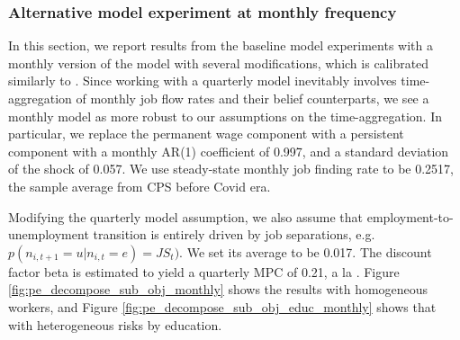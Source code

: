 \subsubsection{Alternative model experiment at monthly frequency}

In this section, we report results from the baseline model experiments with a monthly version of the model with several modifications, which is calibrated similarly to \cite{kekre2023unemployment}. Since working with a quarterly model inevitably involves time-aggregation of monthly job flow rates and their belief counterparts, we see a monthly model as more robust to our assumptions on the time-aggregation. In particular, we replace the permanent wage component with a persistent component with a monthly AR(1) coefficient of 0.997, and a standard deviation of the shock of 0.057. We use steady-state monthly job finding rate to be 0.2517, the sample average from CPS before Covid era. 

Modifying the quarterly model assumption, we also assume that employment-to-unemployment transition is entirely driven by job separations, e.g.  $p(n_{i,t+1}=u|n_{i,t}=e) = JS_{t})$. We set its average to be 0.017. The discount factor beta is estimated to yield a quarterly MPC of 0.21, a la \cite{kekre2023unemployment}.  Figure \ref{fig:pe_decompose_sub_obj_monthly} shows the results with homogeneous workers, and Figure \ref{fig:pe_decompose_sub_obj_educ_monthly} shows that with heterogeneous risks by education.

